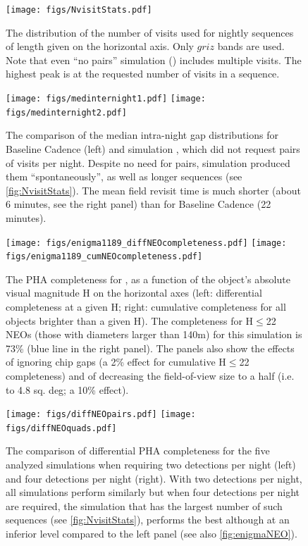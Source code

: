 \begin{figure}[t!]
\vskip -2.5in
\texttt{[image: figs/NvisitStats.pdf]}
\vskip -2.7in
\caption{The distribution of the number of visits used for nightly sequences of
length given on the horizontal axis. Only $griz$ bands are used. Note that even
``no pairs'' simulation ()
includes multiple visits. The highest peak is at the
requested number of visits in a sequence.}
\label{fig:NvisitStats}
\end{figure}

\begin{figure}[t!]
\vskip -1.2in
\texttt{[image: figs/medinternight1.pdf]}
\texttt{[image: figs/medinternight2.pdf]}
\vskip -1.3in
\caption{
The comparison of the median intra-night gap distributions for Baseline Cadence (left)
and simulation , which did not request pairs of visits per night.
Despite no need for pairs, simulation  produced them ``spontaneously'',
as well as longer sequences (see \autoref{fig:NvisitStats}). The mean field revisit
time is much shorter (about 6 minutes, see the right panel) than for Baseline Cadence
(22 minutes).}
\label{fig:intranightgapCompare}
\end{figure}

\begin{figure}[t!]
\vskip -1.1in
\texttt{[image: figs/enigma1189\_diffNEOcompleteness.pdf]}
\hskip -0.5in
\texttt{[image: figs/enigma1189\_cumNEOcompleteness.pdf]}
\vskip -1.2in
\caption{The PHA completeness for , as a function of the object's absolute
visual magnitude H on the horizontal axes (left: differential completeness at a given H;
right: cumulative completeness for all objects brighter than a given H).
The completeness for H$\le$22 NEOs (those with diameters larger than 140m)  for this
simulation is 73\% (blue line in the right panel). The panels also show the effects of ignoring
chip gaps (a 2\% effect for cumulative H$\le$22 completeness) and of decreasing the
field-of-view size to a half (i.e. to 4.8 sq. deg; a 10\% effect).}
\label{fig:enigmaNEO}
\end{figure}

\begin{figure}[th!]
\vskip -1.2in
\texttt{[image: figs/diffNEOpairs.pdf]}
\texttt{[image: figs/diffNEOquads.pdf]}
\vskip -1.3in
\caption{
The comparison of differential PHA completeness for the five analyzed simulations
when requiring two detections per night (left) and four detections per night (right).
With two detections per night, all simulations perform similarly but when four
detections per night are required, the simulation that has the largest number
of such sequences (see \autoref{fig:NvisitStats}), performs the best although at an
inferior level compared to the left panel (see also \autoref{fig:enigmaNEO}).}
\label{fig:NEOquads}
\end{figure}


